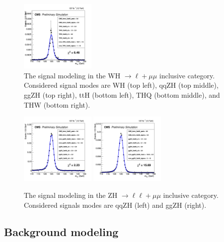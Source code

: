 \begin{figure}[!htb]
  \includegraphics[width=0.32\textwidth]{pics/VH_sec/WH_signal_models/THW_CatAll_fit_DSCB_1.png}
  \caption{The signal modeling in the WH $\to \ell+\mu\mu$ inclusive category. Considered signal modes are WH (top left), 
           qqZH (top middle), ggZH (top right), ttH (bottom left), THQ (bottom middle), and THW (bottom right).}
  \label{fig:signal_models_in_WH3l}
\end{figure}

\begin{figure}[!htb]
  \centering
  \captionsetup{justification=justified}
  \includegraphics[width=0.32\textwidth]{pics/VH_sec/ZH_signal_models/qqZH_CatAll_fit_DSCB_1.png}
  \includegraphics[width=0.32\textwidth]{pics/VH_sec/ZH_signal_models/ggZH_CatAll_fit_DSCB_1.png}
  \caption{The signal modeling in the ZH $\to \ell\ell+\mu\mu$ inclusive category. Considered signals modes are 
           qqZH (left) and ggZH (right).}
  \label{fig:ZH_signal_model_in_ZH4l}
\end{figure}


\subsection{Background modeling}\label{sec:vh_bkg_model}

